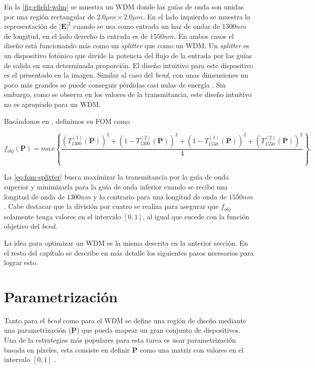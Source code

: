 En la \autoref{fig:efield-wdm} se muestra un WDM donde las guías de onda son unidas por una región rectangular
de $2.0\mu m \times 2.0 \mu m$. En el lado izquierdo se muestra la representación de $|\boldsymbol{E}|^2$ cuando se usa 
como entrada un haz de ondas de $1300 nm$ de longitud, en el lado derecho la entrada es de $1550 nm$.
En ambos casos el diseño está funcionando más como un \emph{splitter} que como un WDM.
Un \emph{splitter} es un dispositivo fotónico que divide la potencia del flujo de la entrada por las guías
de salida en una determinada proporción. El diseño intuitivo para este dispositivo es el presentado en la imagen. Similar al caso del
\emph{bend}, con unas dimensiones un poco más grandes se puede conseguir pérdidas casi nulas de energía
\citep{LukasChrostowski2010}.
Sin embargo, como se observa en los valores de la transmitancia, este diseño intuitivo no es apropiado para un WDM.

Basándonos en \cite{Su2020}, definimos su FOM como

\begin{equation}
  f_{obj}(\boldsymbol{P}) = max \left \{ \frac{\left ( T_{1300}^{(1)}(\boldsymbol{P}) \right )^2  + 
                            \left ( 1 - T_{1300}^{(2)}(\boldsymbol{P}) \right )^2 +
                            \left ( 1 - T_{1550}^{(1)}(\boldsymbol{P}) \right )^2  + 
                            \left ( T_{1550}^{(2)}(\boldsymbol{P}) \right )^2 }{4}
                    \right \}.
\label{eq:fom-splitter}
\end{equation}

La \autoref{eq:fom-splitter} busca maximizar la transmitancia por la guía de onda superior y minimizarla para
la guía de onda inferior cuando se recibe una longitud de onda de $1300 nm$ y lo contrario para una longitud
de onda de $1550 nm$. Cabe destacar que la división por cuatro se realiza para asegurar que $f_{obj}$ solamente
tenga valores en el intervalo $[0, 1]$, al igual que sucede con la función objetivo del \emph{bend}.

La idea para optimizar un WDM es la misma descrita en la anterior sección. 
En el resto del capítulo se describe en más detalle los siguientes pasos necesarios para lograr esto.

\section{Parametrización}\label{sec:parametrization}

Tanto para el \emph{bend} como para el WDM se define una región de diseño
mediante una parametrización ($\boldsymbol{P}$) que pueda mapear un gran conjunto de dispositivos.
Una de la estrategias más populares para esta tarea es usar parametrización
basada en píxeles, esta consiste en definir $\boldsymbol{P}$ como una matriz con valores en el intervalo
$[0, 1]$ \citep{Molesky2018}.

